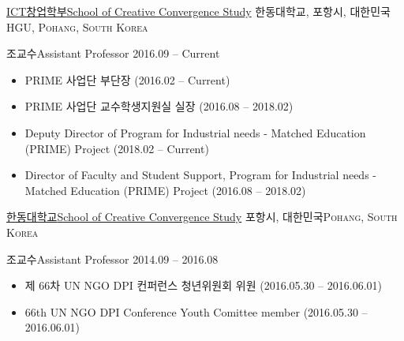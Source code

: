 \documentclass[english,full]{resume_structure}
\begin{document}
\begin{Work}
\ResumeSectionWithSubSection %
{\href{http://www.handong.edu/major/college/global-edison/intro/}{ICT창업학부}}{\href{http://www.handong.edu/eng/academics/undergraduate/gma/about/}{School of Creative Convergence Study}}
{\textsc{한동대학교, 포항시, 대한민국}}{\textsc{HGU, Pohang, South Korea}} {
  \ResumeSubSection %
    {조교수}{Assistant Professor}
    {2016.09 -- Current}
    {
    \begin{itemize}
      \item PRIME 사업단 부단장 (2016.02 -- Current)
    \end{itemize}
    \begin{itemize}
      \item PRIME 사업단 교수학생지원실 실장 (2016.08 -- 2018.02)
    \end{itemize}
    }
    {
    \begin{itemize}
      \item Deputy Director of Program for Industrial needs - Matched Education (PRIME) Project (2018.02 -- Current)
    \end{itemize}
    \begin{itemize}
      \item Director of Faculty and Student Support, Program for Industrial needs - Matched Education (PRIME) Project (2016.08 -- 2018.02)
    \end{itemize}
    }
}
\ResumeSectionWithSubSection %
{\href{http://www.handong.edu}{한동대학교}}{\href{http://www.handong.edu}{School of Creative Convergence Study}}
{\textsc{포항시, 대한민국}}{\textsc{Pohang, South Korea}} {
  \ResumeSubSection %
    {조교수}{Assistant Professor}
    {2014.09 -- 2016.08}
    {
    \begin{itemize}
      \item 제 66차 UN NGO DPI 컨퍼런스 청년위원회 위원 (2016.05.30 -- 2016.06.01)
    \end{itemize}
    }
    {
    \begin{itemize}
      \item 66th UN NGO DPI Conference Youth Comittee member (2016.05.30 -- 2016.06.01)

\end{itemize}}}
\end{Work}
\end{document}
